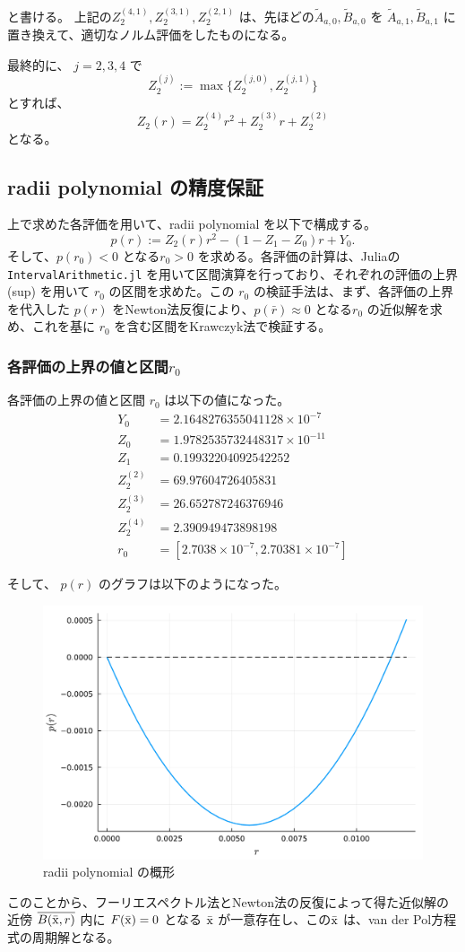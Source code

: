 と書ける。 上記の$Z_2^{(4,1)},Z_2^{(3,1)},Z_2^{(2,1)}$ は、先ほどの$\tilde{A}_{a,0},\tilde{B}_{a,0}$ を $\tilde{A}_{a,1},\tilde{B}_{a,1}$ に置き換えて、適切なノルム評価をしたものになる。

最終的に、 $j = 2,3,4$ で
$$
    Z_2^{(j)} := \max \{ Z_2^{(j,0)} , Z_2^{(j,1)} \}
$$
とすれば、
$$
    Z_2(r) = Z_2^{(4)} r^2 + Z_2^{(3)} r + Z_2^{(2)} 
$$
となる。

\subsection{radii polynomial の精度保証}

上で求めた各評価を用いて、radii polynomial を以下で構成する。
$$
    p(r) := Z_2 (r)r^2 - (1 - Z_1 - Z_0)r + Y_0.
$$
そして、$p(r_0)<0$ となる$r_0>0$ を求める。各評価の計算は、Juliaの \texttt{IntervalArithmetic.jl} を用いて区間演算を行っており、それぞれの評価の上界(sup) を用いて $r_0$ の区間を求めた。この $r_0$ の検証手法は、まず、各評価の上界を代入した $p(r)$ をNewton法反復により、$p(\bar r) \approx 0$ となる$r_0$ の近似解を求め、これを基に $r_0$ を含む区間をKrawczyk法で検証する。\cite{radiipolynomial_interval}

\subsubsection{各評価の上界の値と区間$r_0$}
各評価の上界の値と区間 $r_0$ は以下の値になった。
\begin{align*}
Y_0 &= 2.1648276355041128 \times 10^{-7} \\
Z_0 &= 1.9782535732448317 \times 10^{-11} \\
Z_1 &= 0.19932204092542252 \\
Z_2^{(2)} &= 69.97604726405831 \\
Z_2^{(3)} &= 26.652787246376946 \\
Z_2^{(4)} &= 2.390949473898198 \\
r_0 &= [2.7038 \times 10^{-7},  2.70381 \times 10^{-7}]
\end{align*}

そして、 $p(r)$ のグラフは以下のようになった。

\begin{figure}[h]
	\centering
	\includegraphics[keepaspectratio,scale = 0.35]{./06_VerifyPO/radii_polynomial.pdf}
	\caption{radii polynomial の概形}
\end{figure}

このことから、フーリエスペクトル法とNewton法の反復によって得た近似解の近傍 $\overline{B(\bar{\mathrm x},r)}$ 内に $F(\bar{\mathrm x}) = 0$ となる $\bar{\mathrm x}$ が一意存在し、この$\bar{\mathrm x}$ は、van der Pol方程式の周期解となる。

%